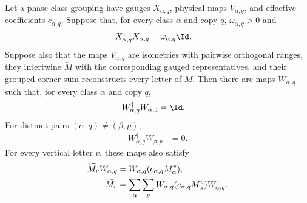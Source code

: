 \begin{lemma}
    \label{thm:normalized_grouped_sector_maps_of_gram}
    \leanok
    Let a phase-class grouping have gauges $X_{\alpha,q}$, physical maps
    $V_{\alpha,q}$, and effective coefficients $c_{\alpha,q}$. Suppose that,
    for every class $\alpha$ and copy $q$, $\omega_{\alpha,q}>0$ and
    \begin{align}
        X_{\alpha,q}^\dagger X_{\alpha,q}
         & =\omega_{\alpha,q}\Id.
        \notag
    \end{align}
    Suppose also that the maps $V_{\alpha,q}$
    are isometries with pairwise orthogonal ranges,
    they intertwine $\widetilde M$ with the corresponding gauged
    representatives, and their grouped corner sum reconstructs every letter
    of $\widetilde M$. Then there are maps $W_{\alpha,q}$ such that, for every
    class $\alpha$ and copy $q$,
    \begin{align}
        W_{\alpha,q}^\dagger W_{\alpha,q} & =\Id.
    \end{align}
    For distinct pairs $(\alpha,q)\ne(\beta,p)$,
    \begin{align}
        W_{\alpha,q}^\dagger W_{\beta,p} & =0.
    \end{align}
    For every vertical letter $v$, these maps also satisfy
    \begin{align}
        \widetilde M_vW_{\alpha,q}
         & =W_{\alpha,q}(c_{\alpha,q}M_\alpha^v),
        \notag                                    \\
        \widetilde M_v
         & =\sum_\alpha\sum_q
        W_{\alpha,q}(c_{\alpha,q}M_\alpha^v)W_{\alpha,q}^\dagger.
        \label{eq:normalized_grouped_sector_maps_of_gram}
    \end{align}
\end{lemma}

